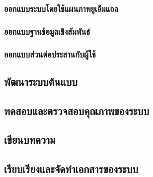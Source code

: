 \documentclass[12pt,a4paper]{article}
\begin{document}
\subsubsection{ออกแบบระบบโดยใช้แผนภาพยูเอ็มแอล}
\subsubsection{ออกแบบฐานข้อมูลเชิงสัมพันธ์}
\subsubsection{ออกแบบส่วนต่อประสานกับผู้ใช้}
\subsection{พัฒนาระบบต้นแบบ}
\subsection{ทดสอบและตรวจสอบคุณภาพของระบบ}
\subsection{เขียนบทความ}
\subsection{เรียบเรียงและจัดทําเอกสารของระบบ}
\end{document}
